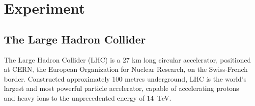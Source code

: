
\chapter{Experiment}
\label{chp:experiment}

\section{The Large Hadron Collider}
The Large Hadron Collider (LHC) is a 27 km long circular accelerator, positioned at CERN, the European Organization for Nuclear Research, on the Swiss-French border. Constructed approximately 100  metres underground, LHC is the world's largest and most powerful particle accelerator, capable of accelerating protons and heavy ions to the unprecedented energy of \SI{14}{\tera\eV}.


